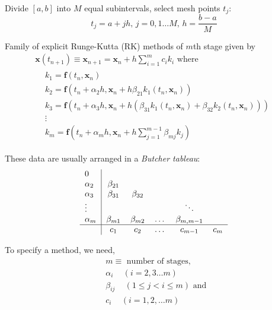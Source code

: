\documentclass[10pt]{amsart}
\begin{document}
\begin{multicols*}{2}
Divide $[a,b]$ into $M$ equal subintervals, select mesh points $t_j$:
\[
t_j = a+ jh, \, j = 0, 1\dots M, \, h = \frac{b-a}{M}
\]

Family of explicit Runge-Kutta (RK) methods of $m$th stage given by
\begin{equation}
\begin{gathered}
	\mathbf{x}(t_{n+1}) \equiv \mathbf{x}_{n+1} = \mathbf{x}_n + h \sum_{i=1}^m c_i k_i \text{ where } \\
	\begin{aligned}
		& k_1 = \mathbf{f}(t_n, \mathbf{x}_n) \\
		& k_2 = \mathbf{f}(t_n + \alpha_2 h, \mathbf{x}_n + h\beta_{21} k_1(t_n, \mathbf{x}_n)) \\
		& k_3 = \mathbf{f}(t_n + \alpha_3 h, \mathbf{x}_n + h( \beta_{31} k_1(t_n, \mathbf{x}_n) + \beta_{32} k_2(t_n, \mathbf{x}_n))) \\
		& \vdots \\
		& k_m = \mathbf{f}(t_n + \alpha_m h, \mathbf{x}_n + h \sum_{j=1}^{m-1} \beta_{mj}k_j)
	\end{aligned}
\end{gathered}
\end{equation}

These data are usually arranged in a \emph{Butcher tableau}:
\[
\begin{tabular}{ l|c c c c c }
	0 & & & & & \\
	$\alpha_2$ & $\beta_{21}$ &  & & & \\ 
	$\alpha_3$ & $\beta_{31}$ & $\beta_{32}$ & & & \\ 
	$\vdots$ &  & & & $\ddots$ & \\ 
	$\alpha_m$ & $\beta_{m1}$ & $\beta_{m2}$ & \dots & $\beta_{m, m-1}$ & \\
	\hline 
	& $c_1$ & $c_2$ & \dots & $c_{m-1}$ & $c_m$ \\
\end{tabular}
\]


To specify a method, we need, 
\begin{equation}
\begin{aligned}
	& m \equiv \text{ number of stages, } \\
	& \alpha_i \quad \, (i= 2, 3 \dots m) \\
	& \beta_{ij} \quad \, (1 \leq j < i \leq m) \text{ and } \\
	& c_i \quad \, (i = 1, 2, \dots m)	
\end{aligned}
\end{equation}


\end{multicols*}
\end{document}
